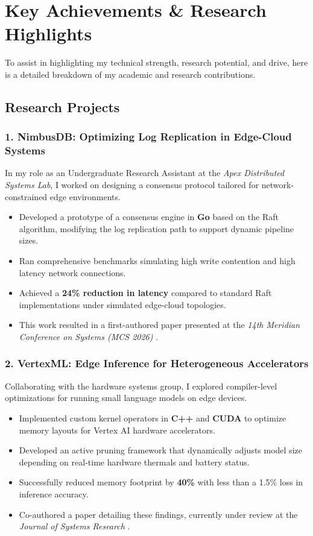 \section{Key Achievements \& Research Highlights}

\noindent
To assist in highlighting my technical strength, research potential, and drive, here is a detailed breakdown of my academic and research contributions.

\subsection{Research Projects}

\subsubsection*{1. NimbusDB: Optimizing Log Replication in Edge-Cloud Systems}
In my role as an Undergraduate Research Assistant at the \textit{Apex Distributed Systems Lab}, I worked on designing a consensus protocol tailored for network-constrained edge environments.
\begin{itemize}
    \item Developed a prototype of a consensus engine in \textbf{Go} based on the Raft algorithm, modifying the log replication path to support dynamic pipeline sizes.
    \item Ran comprehensive benchmarks simulating high write contention and high latency network connections.
    \item Achieved a \textbf{24\% reduction in latency} compared to standard Raft implementations under simulated edge-cloud topologies.
    \item This work resulted in a first-authored paper presented at the \textit{14th Meridian Conference on Systems (MCS 2026)} \parencite{chen2026nimbusdb}.
\end{itemize}

\subsubsection*{2. VertexML: Edge Inference for Heterogeneous Accelerators}
Collaborating with the hardware systems group, I explored compiler-level optimizations for running small language models on edge devices.
\begin{itemize}
    \item Implemented custom kernel operators in \textbf{C++} and \textbf{CUDA} to optimize memory layouts for Vertex AI hardware accelerators.
    \item Developed an active pruning framework that dynamically adjusts model size depending on real-time hardware thermals and battery status.
    \item Successfully reduced memory footprint by \textbf{40\%} with less than a 1.5\% loss in inference accuracy.
    \item Co-authored a paper detailing these findings, currently under review at the \textit{Journal of Systems Research} \parencite{chen2025vertex}.
\end{itemize}

